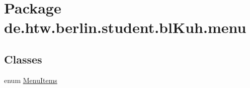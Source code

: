 \hypertarget{namespacede_1_1htw_1_1berlin_1_1student_1_1bl_kuh_1_1menu}{\section{Package de.\-htw.\-berlin.\-student.\-bl\-Kuh.\-menu}
\label{namespacede_1_1htw_1_1berlin_1_1student_1_1bl_kuh_1_1menu}
}
\subsection*{Classes}
\begin{DoxyCompactItemize}
\item 
enum \hyperlink{enumde_1_1htw_1_1berlin_1_1student_1_1bl_kuh_1_1menu_1_1_menu_items}{Menu\-Items}
\end{DoxyCompactItemize}
